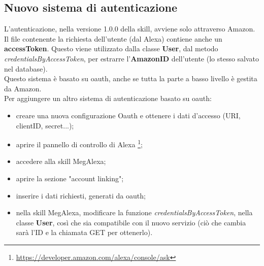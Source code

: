\subsection{Nuovo sistema di autenticazione}\label{newAuth}
L'autenticazione, nella versione 1.0.0 della skill, avviene solo attraverso Amazon.\\
Il file contenente la richiesta dell'utente (dal Alexa) contiene anche un \textbf{accessToken}. Questo viene utilizzato dalla classe \textbf{User}, dal metodo \textit{credentialsByAccessToken}, per estrarre l'\textbf{AmazonID} dell'utente (lo stesso salvato nel database).\\
Questo sistema è basato su oauth, anche se tutta la parte a basso livello è gestita da Amazon.\\
Per aggiungere un altro sistema di autenticazione basato su oauth:
\begin{itemize}
	\item creare una nuova configurazione Oauth e ottenere i dati d'accesso (URI, clientID, secret...);
	\item aprire il pannello di controllo di Alexa \footnote{\url{https://developer.amazon.com/alexa/console/ask}};
	\item accedere alla skill MegAlexa;
	\item aprire la sezione "account linking";
	\item inserire i dati richiesti, generati da oauth;
	\item nella skill MegAlexa, modificare la funzione \textit{credentialsByAccessToken}, nella classe \textbf{User}, così che sia compatibile con il nuovo servizio (ciò che cambia sarà l'ID e la chiamata GET per ottenerlo).
\end{itemize}